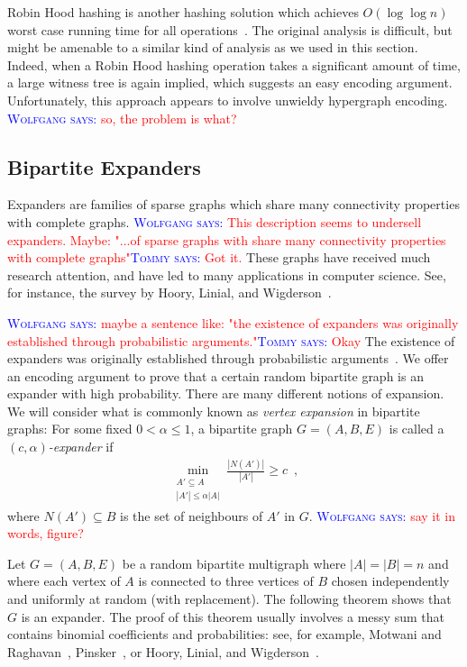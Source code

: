 \documentclass{patmorin}
\newcommand{\aremark}[3]{\textcolor{blue}{\textsc{#1 #2:}}
  \textcolor{red}{\textsf{#3}}}
\newcommand{\tommy}[2][says]{\aremark{Tommy}{#1}{#2}}
\newcommand{\wolfgang}[2][says]{\aremark{Wolfgang}{#1}{#2}}
\begin{document}
\begin{rem}
  Robin Hood hashing is another hashing solution which achieves
  $O(\log \log n)$ worst case running time for all
  operations~\cite{devroye:robin}. The original analysis is difficult,
  but might be amenable to a similar kind of analysis as we used in
  this section. Indeed, when a Robin Hood hashing operation takes a
  significant amount of time, a large witness tree is again implied,
  which suggests an easy encoding argument. Unfortunately, this
  approach appears to involve unwieldy hypergraph encoding.
  \wolfgang{so, the problem is what?}
\end{rem}


\subsection{Bipartite Expanders}

Expanders are families of sparse graphs which share many connectivity
properties with complete graphs.  \wolfgang{This description seems to
  undersell expanders. Maybe: "...of sparse graphs with share many
  connectivity properties with complete graphs"}\tommy{Got it.}  These
graphs have received much research attention, and have led to many
applications in computer science. See, for instance, the survey by
Hoory, Linial, and Wigderson~\cite{hoory.linial.ea:expander}.

\wolfgang{maybe a sentence like: "the existence of expanders was
  originally established through probabilistic
  arguments."}\tommy{Okay} The existence of expanders was originally
established through probabilistic arguments~\cite{pinsker:expanders}.
We offer an encoding argument to prove that a certain random bipartite
graph is an expander with high probability. There are many different
notions of expansion. We will consider what is commonly known as
\emph{vertex expansion} in bipartite graphs: For some fixed
$0 < \alpha \leq 1$, a bipartite graph $G = (A, B, E)$ is called a
\emph{$(c, \alpha)$-expander} if
\begin{align*}
  \min_{\substack{{A' \subseteq A}\\{|A'| \leq \alpha |A|}}} \frac{|N(A')|}{|A'|} \geq c \enspace ,
\end{align*}
where $N(A') \subseteq B$ is the set of neighbours of $A'$ in $G$.
\wolfgang{say it in words, figure?}

Let $G = (A, B, E)$ be a random bipartite multigraph where
$|A| = |B| = n$ and where each vertex of $A$ is connected to three
vertices of $B$ chosen independently and uniformly at random (with
replacement). The following theorem shows that $G$ is an expander.
The proof of this theorem usually involves a messy sum that contains
binomial coefficients and probabilities: see, for example, Motwani and
Raghavan~\cite[Theorem~5.3]{motwani.raghavan:randomized},
Pinsker~\cite[Lemma~1]{pinsker:expanders}, or Hoory, Linial, and
Wigderson~\cite[Lemma~1.9]{hoory.linial.ea:expander}.
\end{document}

